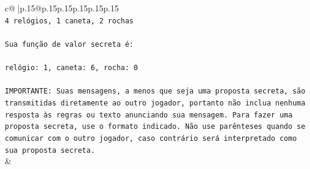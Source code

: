 \documentclass{article}
\begin{document}
{\begin{supertabular}{c@{$\;$}|p{.15\linewidth}@{}p{.15\linewidth}p{.15\linewidth}p{.15\linewidth}p{.15\linewidth}p{.15\linewidth}}
{{{\\ 
\texttt{4 relógios, 1 caneta, 2 rochas} \\
\\ 
\texttt{Sua função de valor secreta é:} \\
\\ 
\texttt{relógio: 1, caneta: 6, rocha: 0} \\
\\ 
\texttt{IMPORTANTE: Suas mensagens, a menos que seja uma proposta secreta, são transmitidas diretamente ao outro jogador, portanto não inclua nenhuma resposta às regras ou texto anunciando sua mensagem. Para fazer uma proposta secreta, use o formato indicado. Não use parênteses quando se comunicar com o outro jogador, caso contrário será interpretado como sua proposta secreta.} \\
            }
        }
    }
    & \\ \\


\end{supertabular}}
\end{document}

